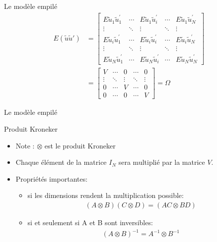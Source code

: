 \documentclass{beamer}
\begin{document}
\begin{frame}{Le modèle empilé}
\begin{align*}
E(\tilde{u}\tilde{u}') & =\begin{bmatrix} 
E\tilde{u}_1\tilde{u}_1^{'} & \cdots & E\tilde{u}_1\tilde{u}_i^{'} & \cdots &  E\tilde{u}_1\tilde{u}_N^{'} \\
\vdots & \ddots & \vdots & \ddots & \vdots \\
E\tilde{u}_i\tilde{u}_1^{'} & \cdots & E\tilde{u}_i\tilde{u}_i^{'} & \cdots &  E\tilde{u}_i\tilde{u}_N^{'} \\
\vdots & \ddots & \vdots & \ddots & \vdots \\
E\tilde{u}_N\tilde{u}_1^{'} & \cdots & E\tilde{u}_N\tilde{u}_i^{'} & \cdots &  E\tilde{u}_N\tilde{u}_N^{'} 
\end{bmatrix}\\ & = \begin{bmatrix} 
V & \cdots & 0 & \cdots & 0 \\
\vdots & \ddots & \vdots & \ddots & \vdots \\
0 & \cdots & V & \cdots & 0 \\
0 & \cdots & 0 & \cdots & V
\end{bmatrix}= \Omega 
\end{align*}
\end{frame}

\begin{frame}{Le modèle empilé}
\begin{block}{Produit Kroneker}
\begin{itemize}
\item Note : $\otimes$ est le produit Kroneker 
\item Chaque élément de la matrice $I_N$ sera multiplié par la matrice $V$.
\item Propriétés importantes:
\begin{itemize}
\item si les dimensions rendent la multiplication possible:
\begin{align*}
(A \otimes B)(C \otimes D)=(AC \otimes BD)
\end{align*}
\item si et seulement si A et B sont inversibles:
\begin{align*}
(A \otimes B)^{-1}=A^{-1} \otimes B^{-1}
\end{align*}
\end{itemize}
\end{itemize}
\end{block}
\end{frame}
\end{document}
